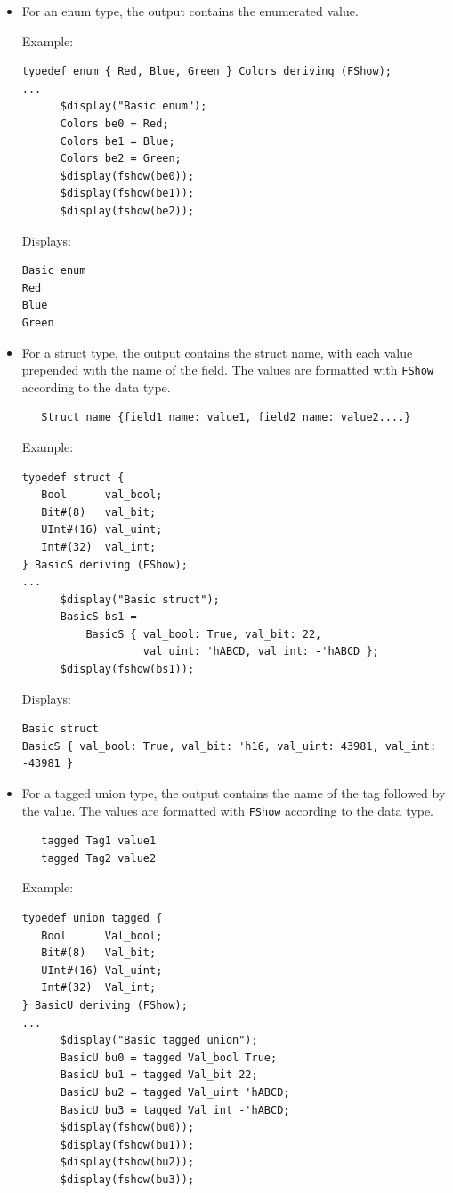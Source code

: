 \documentclass[twoside,letterpaper]{article}
\newcommand{\te}[1]{\texttt{#1}}
\begin{document}
\begin{itemize}

\item For an enum type, the output contains the enumerated value.

Example:
\begin{verbatim}
typedef enum { Red, Blue, Green } Colors deriving (FShow);
...
      $display("Basic enum");
      Colors be0 = Red;
      Colors be1 = Blue;
      Colors be2 = Green;
      $display(fshow(be0));
      $display(fshow(be1));
      $display(fshow(be2));
\end{verbatim}

Displays:
\begin{verbatim}
Basic enum
Red
Blue
Green
\end{verbatim}

\item For a struct type, the output contains the struct name, with
each value prepended with the name of the field.  The values are
formatted with \te{FShow} according to the data type.
\begin{verbatim}
   Struct_name {field1_name: value1, field2_name: value2....}
\end{verbatim}

Example:

\begin{verbatim}
typedef struct {
   Bool      val_bool;
   Bit#(8)   val_bit;
   UInt#(16) val_uint;
   Int#(32)  val_int;
} BasicS deriving (FShow);
...
      $display("Basic struct");
      BasicS bs1 =
          BasicS { val_bool: True, val_bit: 22,
                   val_uint: 'hABCD, val_int: -'hABCD };
      $display(fshow(bs1));
\end{verbatim}

Displays:
\begin{verbatim}
Basic struct
BasicS { val_bool: True, val_bit: 'h16, val_uint: 43981, val_int:      -43981 }
\end{verbatim}

\item For a tagged union type, the output contains the name of the tag
followed by the value.  The values are
formatted with \te{FShow} according to the data type.

\begin{verbatim}
   tagged Tag1 value1
   tagged Tag2 value2
\end{verbatim}

Example:
\begin{verbatim}
typedef union tagged {
   Bool      Val_bool;
   Bit#(8)   Val_bit;
   UInt#(16) Val_uint;
   Int#(32)  Val_int;
} BasicU deriving (FShow);
...
      $display("Basic tagged union");
      BasicU bu0 = tagged Val_bool True;
      BasicU bu1 = tagged Val_bit 22;
      BasicU bu2 = tagged Val_uint 'hABCD;
      BasicU bu3 = tagged Val_int -'hABCD;
      $display(fshow(bu0));
      $display(fshow(bu1));
      $display(fshow(bu2));
      $display(fshow(bu3));
\end{verbatim}


\end{itemize}
\end{document}
